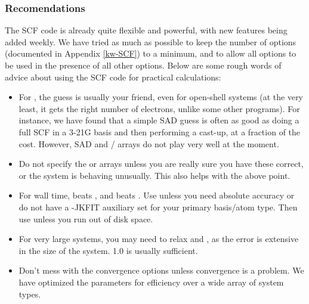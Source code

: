 \subsubsection{Recomendations}

The SCF code is already quite flexible and powerful, with new features being
added weekly. We have tried as much as possible to keep the number of options 
(documented in Appendix \ref{kw-SCF})
to a minimum, and to allow all options to be used in the presence of all other
options. Below are some rough words of advice about using the SCF code for
practical calculations:
\begin{itemize}
\item For , the  guess is usually your friend, even for open-shell systems (at the
very least, it gets the right number of electrons, unlike some other programs).
For instance, we have found that a simple SAD guess is often as good as doing a
full SCF in a 3-21G basis and then performing a cast-up, at a fraction of the
cost.  However, SAD and / arrays do not play very well
at the moment. 
\item Do not specify the  or  arrays unless you are
really sure you have these correct, or the system is behaving unusually. 
This also helps with the above point.
\item For wall time,  beats , and 
 beats
. Use  unless you need absolute accuracy or do not
have a -JKFIT auxiliary set for your primary basis/atom type. Then use
 unless you run out of disk space.
\item For very large systems, you may need to relax  and
, as the error is extensive in the size of the system.
1.0 is usually sufficient.  
\item Don't mess with the convergence options unless convergence is a problem.
We have optimized the parameters for efficiency over a wide array of system
types.  
\end{itemize} 
